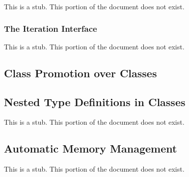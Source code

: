 This is a stub.  This portion of the document does not exist.

\subsubsection{The Iteration Interface}
\label{The_Iteration_Interface}

This is a stub.  This portion of the document does not exist.

\subsection{Class Promotion over Classes}
\label{Scalar Promotion}

\subsection{Nested Type Definitions in Classes}
\label{Nested_Type_Definitions_in_Classes}

This is a stub.  This portion of the document does not exist.

\subsection{Automatic Memory Management}
\label{Automatic_Memory_Management}

This is a stub.  This portion of the document does not exist.
